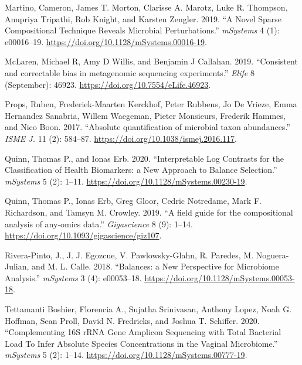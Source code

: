 \documentclass[
]{article}
\newlength{\cslhangindent}
\newlength{\cslentryspacingunit} %
\newenvironment{CSLReferences}[2] %
 {%
  \setlength{\parindent}{0pt}
  \ifodd #1
  \let\oldpar\par
  \def\par{\hangindent=\cslhangindent\oldpar}
  \fi
  \setlength{\parskip}{#2\cslentryspacingunit}
 }%
 {}
\theoremstyle{definition}
\theoremstyle{definition}
\theoremstyle{definition}
\theoremstyle{definition}
\theoremstyle{remark}
\begin{document}
\begin{CSLReferences}{1}{0}
\leavevmode{}%
Martino, Cameron, James T. Morton, Clarisse A. Marotz, Luke R. Thompson, Anupriya Tripathi, Rob Knight, and Karsten Zengler. 2019. {``{A Novel Sparse Compositional Technique Reveals Microbial Perturbations}.''} \emph{mSystems} 4 (1): e00016--19. \url{https://doi.org/10.1128/mSystems.00016-19}.

\leavevmode{}%
McLaren, Michael R, Amy D Willis, and Benjamin J Callahan. 2019. {``{Consistent and correctable bias in metagenomic sequencing experiments}.''} \emph{Elife} 8 (September): 46923. \url{https://doi.org/10.7554/eLife.46923}.

\leavevmode{}%
Props, Ruben, Frederiek-Maarten Kerckhof, Peter Rubbens, Jo De Vrieze, Emma Hernandez Sanabria, Willem Waegeman, Pieter Monsieurs, Frederik Hammes, and Nico Boon. 2017. {``{Absolute quantification of microbial taxon abundances}.''} \emph{ISME J.} 11 (2): 584--87. \url{https://doi.org/10.1038/ismej.2016.117}.

\leavevmode{}%
Quinn, Thomas P., and Ionas Erb. 2020. {``{Interpretable Log Contrasts for the Classification of Health Biomarkers: a New Approach to Balance Selection}.''} \emph{mSystems} 5 (2): 1--11. \url{https://doi.org/10.1128/mSystems.00230-19}.

\leavevmode{}%
Quinn, Thomas P., Ionas Erb, Greg Gloor, Cedric Notredame, Mark F. Richardson, and Tamsyn M. Crowley. 2019. {``{A field guide for the compositional analysis of any-omics data}.''} \emph{Gigascience} 8 (9): 1--14. \url{https://doi.org/10.1093/gigascience/giz107}.

\leavevmode{}%
Rivera-Pinto, J., J. J. Egozcue, V. Pawlowsky-Glahn, R. Paredes, M. Noguera-Julian, and M. L. Calle. 2018. {``{Balances: a New Perspective for Microbiome Analysis}.''} \emph{mSystems} 3 (4): e00053--18. \url{https://doi.org/10.1128/mSystems.00053-18}.

\leavevmode{}%
Tettamanti Boshier, Florencia A., Sujatha Srinivasan, Anthony Lopez, Noah G. Hoffman, Sean Proll, David N. Fredricks, and Joshua T. Schiffer. 2020. {``{Complementing 16S rRNA Gene Amplicon Sequencing with Total Bacterial Load To Infer Absolute Species Concentrations in the Vaginal Microbiome}.''} \emph{mSystems} 5 (2): 1--14. \url{https://doi.org/10.1128/mSystems.00777-19}.


\end{CSLReferences}
\end{document}
